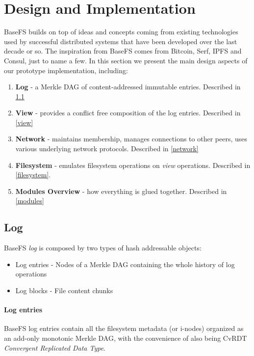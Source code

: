 \documentclass{sig-alternate}
\begin{document}
\section{Design and Implementation}

BaseFS builds on top of ideas and concepts coming from existing technologies used by successful distributed systems that have been developed over the last decade or so. The inspiration from BaseFS comes from Bitcoin, Serf, IPFS and Consul, just to name a few. In this section we present the main design aspects of our prototype implementation, including:

\begin{enumerate}
\item \textbf{Log} - a Merkle DAG of content-addressed immutable entries. Described in \ref{log}
\item \textbf{View} - provides a conflict free composition of the log entries. Described in \ref{view}
\item \textbf{Network} - maintains membership, manages connections to other peers, uses various underlying network protocols. Described in \ref{network}
\item \textbf{Filesystem} - emulates filesystem operations on \textit{view} operations. Described in \ref{filesystem}.
\item \textbf{Modules Overview} - how everything is glued together. Described in \ref{modules}
\end{enumerate}

\subsection{Log}  \label{log}

BaseFS \textit{log} is composed by two types of hash addressable objects:

\begin{itemize}
    \item Log entries - Nodes of a Merkle DAG containing the whole history of log operations
    \item Log blocks - File content chunks
\end{itemize}


\paragraph{Log entries}
BaseFS log entries contain all the filesystem metadata (or i-nodes) organized as an add-only monotonic Merkle DAG, with the convenience of also being CvRDT \textit{Convergent Replicated Data Type}\cite{shapiro2011comprehensive}.
\end{document}
